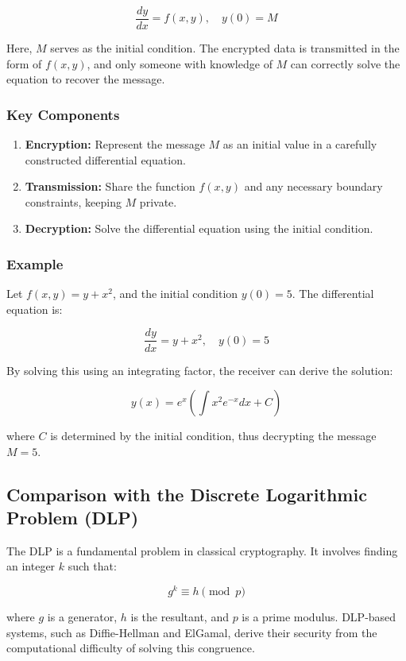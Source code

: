 \documentclass[12pt]{article}
\begin{document}
\[
\frac{dy}{dx} = f(x, y), \quad y(0) = M
\]

Here, \( M \) serves as the initial condition. The encrypted data is transmitted in the form of \( f(x, y) \), and only someone with knowledge of \( M \) can correctly solve the equation to recover the message.

\subsubsection*{Key Components}
\begin{enumerate}
    \item \textbf{Encryption:} Represent the message \( M \) as an initial value in a carefully constructed differential equation.
    \item \textbf{Transmission:} Share the function \( f(x, y) \) and any necessary boundary constraints, keeping \( M \) private.
    \item \textbf{Decryption:} Solve the differential equation using the initial condition.
\end{enumerate}

\subsubsection*{Example}

Let \( f(x, y) = y + x^2 \), and the initial condition \( y(0) = 5 \). The differential equation is:

\[
\frac{dy}{dx} = y + x^2, \quad y(0) = 5
\]

By solving this using an integrating factor, the receiver can derive the solution:

\[
y(x) = e^x \left(\int x^2 e^{-x} dx + C\right)
\]

where \( C \) is determined by the initial condition, thus decrypting the message \( M = 5 \).

\subsection*{Comparison with the Discrete Logarithmic Problem (DLP)}

The DLP is a fundamental problem in classical cryptography. It involves finding an integer \( k \) such that:

\[
g^k \equiv h \pmod{p}
\]

where \( g \) is a generator, \( h \) is the resultant, and \( p \) is a prime modulus. DLP-based systems, such as Diffie-Hellman and ElGamal, derive their security from the computational difficulty of solving this congruence.
\end{document}
